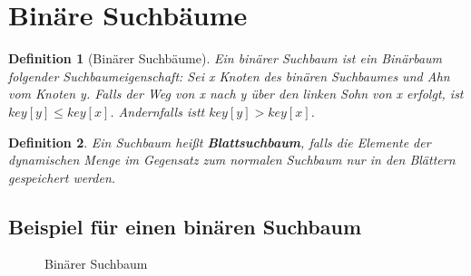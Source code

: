 \documentclass[ngerman,draft,parskip=half*,twoside]{scrreprt}
\theoremstyle{break}
\newtheorem{definition}{Definition}
\begin{document}
  \section{Binäre Suchbäume}

   \begin{definition}[Binärer Suchbäume]
    Ein binärer Suchbaum ist ein Binärbaum folgender Suchbaumeigenschaft:
    Sei x Knoten des binären Suchbaumes und Ahn vom Knoten y. Falls der Weg von x nach y über den linken Sohn von x erfolgt, ist
    $key[ y ]\leq key[ x ]$. Andernfalls istt $key[ y ]> key[ x ]$.
   \end{definition}

   \begin{definition}
   Ein Suchbaum heißt \textbf{Blattsuchbaum}, falls die Elemente der dynamischen Menge im Gegensatz zum normalen Suchbaum nur in den
   Blättern gespeichert werden.
   \end{definition}

  \subsection{Beispiel für einen binären Suchbaum}
  \begin{figure}[ht]
  \centering  
   \caption{Binärer Suchbaum}
   \label{171103a}
  \end{figure}
\end{document}

